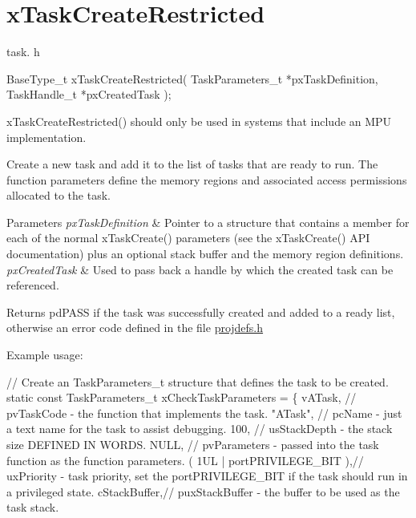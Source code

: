 \hypertarget{group__x_task_create_restricted}{}\section{x\+Task\+Create\+Restricted}
\label{group__x_task_create_restricted}
task. h 
\begin{DoxyPre}
 BaseType\_t xTaskCreateRestricted( TaskParameters\_t *pxTaskDefinition, TaskHandle\_t *pxCreatedTask );\end{DoxyPre}


x\+Task\+Create\+Restricted() should only be used in systems that include an M\+P\+U implementation.

Create a new task and add it to the list of tasks that are ready to run. The function parameters define the memory regions and associated access permissions allocated to the task.


\begin{DoxyParams}{Parameters}
{\em px\+Task\+Definition} & Pointer to a structure that contains a member for each of the normal x\+Task\+Create() parameters (see the x\+Task\+Create() A\+P\+I documentation) plus an optional stack buffer and the memory region definitions.\\
\hline
{\em px\+Created\+Task} & Used to pass back a handle by which the created task can be referenced.\\
\hline
\end{DoxyParams}
\begin{DoxyReturn}{Returns}
pd\+P\+A\+S\+S if the task was successfully created and added to a ready list, otherwise an error code defined in the file \hyperlink{projdefs_8h_source}{projdefs.\+h}
\end{DoxyReturn}
Example usage\+: 
\begin{DoxyPre}
// Create an TaskParameters\_t structure that defines the task to be created.
static const TaskParameters\_t xCheckTaskParameters =
\{
    vATask,     // pvTaskCode - the function that implements the task.
    "ATask",    // pcName - just a text name for the task to assist debugging.
    100,        // usStackDepth - the stack size DEFINED IN WORDS.
    NULL,       // pvParameters - passed into the task function as the function parameters.
    ( 1UL | portPRIVILEGE\_BIT ),// uxPriority - task priority, set the portPRIVILEGE\_BIT if the task should run in a privileged state.
    cStackBuffer,// puxStackBuffer - the buffer to be used as the task stack.\end{DoxyPre}



